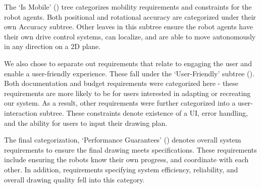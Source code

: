 The `Is Mobile' () tree categorizes mobility requirements and constraints for the robot agents. Both positional and rotational accuracy are categorized under their own Accuracy subtree. Other leaves in this subtree ensure the robot agents have their own drive control systems, can localize, and are able to move autonomously in any direction on a 2D plane.

We also chose to separate out requirements that relate to engaging the user and  enable a user-friendly experience. These fall under the `User-Friendly' subtree (). Both documentation and budget requirements were categorized here - these requirements are more likely to be for users interested in adapting or recreating our system. As a result, other requirements were further categorized into a user-interaction subtree. These constraints denote existence of a UI, error handling, and the ability for users to input their drawing plan.

The final categorization, `Performance Guarantees' () denotes overall system requirements to ensure the final drawing meets specifications. These requirements include ensuring the robots know their own progress, and coordinate with each other. In addition, requirements specifying system efficiency, reliability, and overall drawing quality fell into this category.

